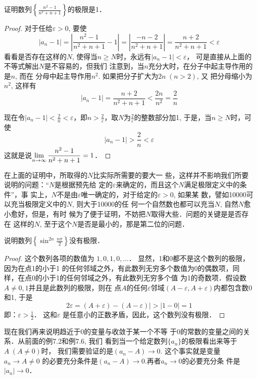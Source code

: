 \begin{example}
    证明数列$\left\{\frac{n^2-1}{n^2+n+1}\right\}$的极限是1．
\end{example}

\begin{proof}
对于任给$\varepsilon>0$, 
要使
\[|a_n-1|=\left|\frac{n^2-1}{n^2+n+1}-1\right|=\left|\frac{-n-2}{n^2+n+1}\right|=\frac{n+2}{n^2+n+1}<\varepsilon\]
看看是否存在这样的$N$, 使得当$n\ge N$时，永远有$|a_n-1|<\varepsilon$，
可是直接从上面的不等式解出$N$是不容易的，但我们
注意到，当$n$充分大时，在分子中起主导作用的是$n$, 而在
分母中起主导作用$n^2$. 如果把分子扩大为$2n\; (n>2)$, 又
把分母缩小为$n^2$, 这样有
\[|a_n-1|=\frac{n+2}{n^2+n+1}<\frac{2n}{n^2}=\frac{2}{n}\]

现在令$|a_n-1|<\frac{2}{n}<\varepsilon$，即$n>\frac{2}{\varepsilon}$，取$N$为$\frac{2}{\varepsilon}$的整数部分加1, 于是，当$n\ge N$时，可使
\[|a_n-1|>\frac{2}{n}<\varepsilon\]
这就是说$\displaystyle\lim_{n\to\infty}\dfrac{n^2-1}{n^2+n+1}=1$．
\end{proof}

在上面的证明中，所取得的$N$比实际所需要的要大一
些，这样并不影响我们所要说明的问题：“$N$是根据预先给
定的$\varepsilon$来确定的，而且这个$N$满足极限定义中的条件”，事
实上，$N$不是由$\varepsilon$唯一确定的，对于给定的$\varepsilon>0$, 如果某
数，譬如10000可以充当极限定义中的$N$, 则大于10000的任
何一个自然数也都可以充当$N$, 自然$N$愈小愈好，但是，有时
候为了便于证明，不妨把$N$取得大些．问题的关键是是否存在
这样的$N$, 至于这个$N$是否是最小的，那是第二位的问题．

\begin{example}
说明数列$\left\{\sin^{2n}\frac{n\pi}{2}\right\}$没有极限．
\end{example}

\begin{proof}
这个数列各项的数值为
$1,0,1,0,\ldots$．
显然，1和0都不是这个数列的极限，因为在点1的小于1
的任何邻域之外，有此数列无穷多个数值为0的偶数项，同
样，在点0的小于1的任何邻域之外，有此数列无穷多个值
为1的奇数项．假设数$A\ne 0,1$并且是此数列的极限，则在
点$A$的任何$\varepsilon$邻域$(A-\varepsilon ,A+\varepsilon )$内都包含数0和1, 于是
\[2\varepsilon =(A+\varepsilon )-(A-\varepsilon )|>|1-0|=1\]
即：$\varepsilon>\frac{1}{2}$．
这和$\varepsilon$ 是任意小的正数矛盾，因此，这个数列没有极限．
\end{proof}

现在我们再来说明趋近于0的变量与收敛于某一个不等
于0的常数的变量之间的关系．从前面的例7.2和例7.6, 我们
看到当一个给定数列$\{a_n\}$的极限看出来等于$A\; (A\ne 0)$时，
我们需要验证的是$(a_n-A)\to 0$. 这个事实就是变量$a_n\to A\ne 0$
的必要充分条件是$(a_n-A)\to 0$.再者$a_n\to 0$的必要充分条
件是$|a_n|\to 0$．

